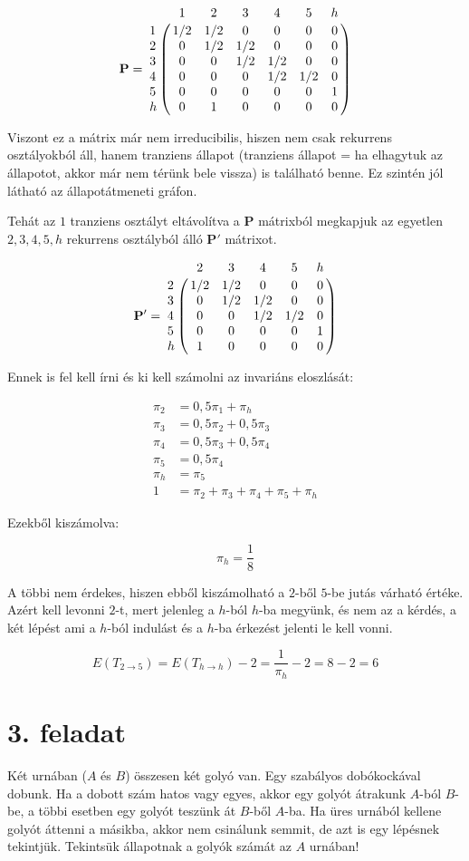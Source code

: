 \documentclass[a4paper,12pt]{article}
\begin{document}
\[
\mathbf{P} = 
\bordermatrix{
~	&	1	&	2	&	3	&	4	&	5	&    h    \cr
1	&	1/2	&	1/2	&	0	&	0	&	0	&    0    \cr
2	&	0	&	1/2	&	1/2	&	0	&	0	&    0    \cr
3	&	0	&	0	&	1/2	&	1/2	&	0	&    0    \cr
4	&	0	&	0	&	0	&	1/2	&	1/2	&    0    \cr
5	&	0	&	0	&	0	&	0	&	0   &    1    \cr
h	&	0	&	1	&	0	&	0	&	0   &    0}
\]

Viszont ez a mátrix már nem irreducibilis, hiszen nem csak rekurrens
osztályokból áll, hanem tranziens állapot (tranziens állapot = ha 
elhagytuk az állapotot, akkor már nem térünk bele vissza) is található 
benne. Ez szintén jól látható az állapotátmeneti gráfon.

Tehát az ${1}$ tranziens osztályt eltávolítva a $\mathbf{P}$ mátrixból
megkapjuk az egyetlen ${2, 3, 4, 5, h}$ rekurrens osztályból álló
$\mathbf{P'}$ mátrixot.

\[
\mathbf{P'} = 
\bordermatrix{
~	&	2	&	3	&	4	&	5	&    h    \cr
2	&	1/2	&	1/2	&	0	&	0	&    0    \cr
3	&	0	&	1/2	&	1/2	&	0	&    0    \cr
4	&	0	&	0	&	1/2	&	1/2	&    0    \cr
5	&	0	&	0	&	0	&	0   &    1    \cr
h	&	1	&	0	&	0	&	0   &    0}
\]

Ennek is fel kell írni és ki kell számolni az invariáns eloszlását:

\begin{align*}
\pi_2 &= 0,5 \pi_1 + \pi_h \\
\pi_3 &= 0,5 \pi_2 + 0,5 \pi_3 \\
\pi_4 &= 0,5 \pi_3 + 0,5 \pi_4 \\
\pi_5 &= 0,5 \pi_4 \\
\pi_h &= \pi_5 \\
1 &= \pi_2 + \pi_3 + \pi_4 + \pi_5 + \pi_h
\end{align*}

Ezekből kiszámolva:

\[
\pi_h = \frac{1}{8}
\]

A többi nem érdekes, hiszen ebből kiszámolható a $2$-ből $5$-be
jutás várható értéke. Azért kell levonni $2$-t, mert jelenleg a
$h$-ból $h$-ba megyünk, és nem az a kérdés, a két lépést ami a 
$h$-ból indulást és a $h$-ba érkezést jelenti le kell vonni.

\[
E(T_{2 \to 5}) = E(T_{h \to h}) - 2 = \frac{1}{\pi_h} - 2 =
8-2 = 6
\]

\pagebreak
\section*{3. feladat}
Két urnában ($A$ és $B$) összesen két golyó van. Egy szabályos 
dobókockával dobunk. Ha a dobott szám hatos vagy egyes, akkor egy
golyót átrakunk $A$-ból $B$-be, a többi esetben egy golyót teszünk
át $B$-ből $A$-ba. Ha üres urnából kellene golyót áttenni a másikba,
akkor nem csinálunk semmit, de azt is egy lépésnek tekintjük.
Tekintsük állapotnak a golyók számát az $A$ urnában!
\end{document}
